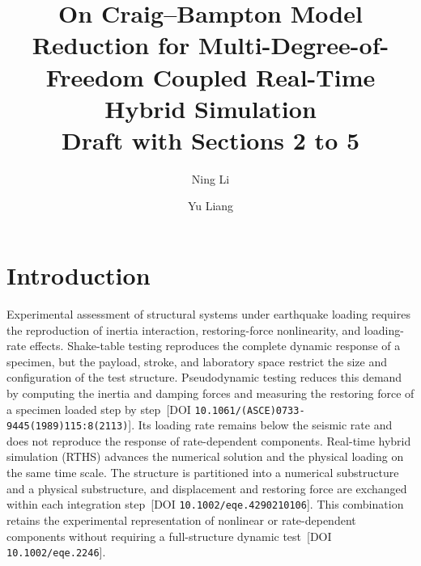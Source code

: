 \documentclass[11pt,a4paper]{article}
\title{On Craig--Bampton Model Reduction for Multi-Degree-of-Freedom Coupled Real-Time Hybrid Simulation\\[4pt]
\large Draft with Sections 2 to 5}
\author{Ning Li \and Yu Liang}
\date{}
\numberwithin{equation}{section}
\begin{document}
\maketitle

\begin{abstract}
	
\end{abstract}

\section{Introduction} \label{sec1}

Experimental assessment of structural systems under earthquake loading requires the reproduction of inertia interaction, restoring-force nonlinearity, and loading-rate effects. Shake-table testing reproduces the complete dynamic response of a specimen, but the payload, stroke, and laboratory space restrict the size and configuration of the test structure. Pseudodynamic testing reduces this demand by computing the inertia and damping forces and measuring the restoring force of a specimen loaded step by step \cite{Mahin1989}\,[DOI \nolinkurl{10.1061/(ASCE)0733-9445(1989)115:8(2113)}]. Its loading rate remains below the seismic rate and does not reproduce the response of rate-dependent components. Real-time hybrid simulation (RTHS) advances the numerical solution and the physical loading on the same time scale. The structure is partitioned into a numerical substructure and a physical substructure, and displacement and restoring force are exchanged within each integration step \cite{Nakashima1992}\,[DOI \nolinkurl{10.1002/eqe.4290210106}]. This combination retains the experimental representation of nonlinear or rate-dependent components without requiring a full-structure dynamic test \cite{Gao2013}\,[DOI \nolinkurl{10.1002/eqe.2246}].
\end{document}
